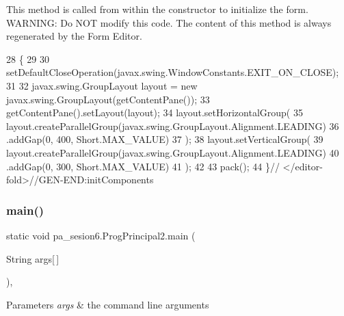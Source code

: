 This method is called from within the constructor to initialize the form. W\+A\+R\+N\+I\+NG\+: Do N\+OT modify this code. The content of this method is always regenerated by the Form Editor. 
\begin{DoxyCode}
28                                   \{
29 
30         setDefaultCloseOperation(javax.swing.WindowConstants.EXIT\_ON\_CLOSE);
31 
32         javax.swing.GroupLayout layout = \textcolor{keyword}{new} javax.swing.GroupLayout(getContentPane());
33         getContentPane().setLayout(layout);
34         layout.setHorizontalGroup(
35             layout.createParallelGroup(javax.swing.GroupLayout.Alignment.LEADING)
36             .addGap(0, 400, Short.MAX\_VALUE)
37         );
38         layout.setVerticalGroup(
39             layout.createParallelGroup(javax.swing.GroupLayout.Alignment.LEADING)
40             .addGap(0, 300, Short.MAX\_VALUE)
41         );
42 
43         pack();
44     \}\textcolor{comment}{// </editor-fold>//GEN-END:initComponents}
\end{DoxyCode}
\mbox{\label{classpa__sesion6_1_1_prog_principal2_a28021247d5b28b8ef35c9f89dadbc6d3}} 
\subsubsection{\texorpdfstring{main()}{main()}}
{\footnotesize\ttfamily static void pa\+\_\+sesion6.\+Prog\+Principal2.\+main (\begin{DoxyParamCaption}\item[{String}]{args\mbox{[}$\,$\mbox{]} }\end{DoxyParamCaption})\hspace{0.3cm}{\ttfamily [inline]}, {\ttfamily [static]}}


\begin{DoxyParams}{Parameters}
{\em args} & the command line arguments \\
\hline
\end{DoxyParams}


